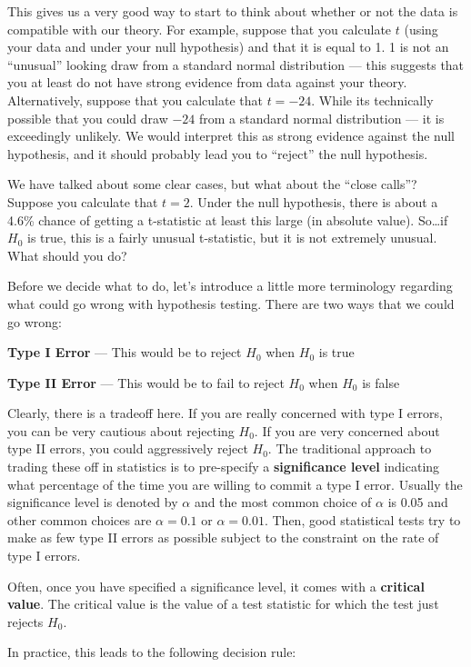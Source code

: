 \documentclass[
  letterpaper,
  DIV=11,
  numbers=noendperiod]{scrreprt}
\begin{document}
This gives us a very good way to start to think about whether or not the
data is compatible with our theory. For example, suppose that you
calculate \(t\) (using your data and under your null hypothesis) and
that it is equal to 1. 1 is not an ``unusual'' looking draw from a
standard normal distribution --- this suggests that you at least do not
have strong evidence from data against your theory. Alternatively,
suppose that you calculate that \(t=-24\). While its technically
possible that you could draw \(-24\) from a standard normal distribution
--- it is exceedingly unlikely. We would interpret this as strong
evidence against the null hypothesis, and it should probably lead you to
``reject'' the null hypothesis.

We have talked about some clear cases, but what about the ``close
calls''? Suppose you calculate that \(t=2\). Under the null hypothesis,
there is about a 4.6\% chance of getting a t-statistic at least this
large (in absolute value). So\ldots if \(H_0\) is true, this is a fairly
unusual t-statistic, but it is not extremely unusual. What should you
do?

Before we decide what to do, let's introduce a little more terminology
regarding what could go wrong with hypothesis testing. There are two
ways that we could go wrong:

\textbf{Type I Error} --- This would be to reject \(H_0\) when \(H_0\)
is true

\textbf{Type II Error} --- This would be to fail to reject \(H_0\) when
\(H_0\) is false

Clearly, there is a tradeoff here. If you are really concerned with type
I errors, you can be very cautious about rejecting \(H_0\). If you are
very concerned about type II errors, you could aggressively reject
\(H_0\). The traditional approach to trading these off in statistics is
to pre-specify a \textbf{significance level} indicating what percentage
of the time you are willing to commit a type I error. Usually the
significance level is denoted by \(\alpha\) and the most common choice
of \(\alpha\) is 0.05 and other common choices are \(\alpha=0.1\) or
\(\alpha=0.01\). Then, good statistical tests try to make as few type II
errors as possible subject to the constraint on the rate of type I
errors.

Often, once you have specified a significance level, it comes with a
\textbf{critical value}. The critical value is the value of a test
statistic for which the test just rejects \(H_0\).

In practice, this leads to the following decision rule:
\end{document}
